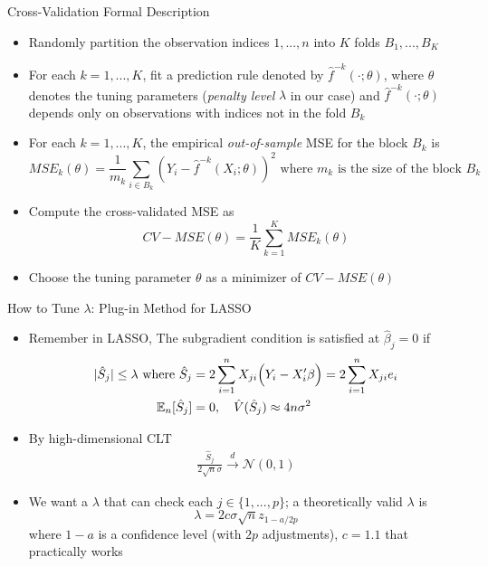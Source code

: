 \documentclass[aspectratio=1610,12pt,xcolor=dvipsnames]{beamer}
\begin{document}
\begin{frame}{Cross-Validation Formal Description}

\begin{itemize}
    \item Randomly partition the observation indices $1,...,n$ into $K$ folds $B_1,...,B_K$
    \item For each $k = 1,...,K$, fit a prediction rule denoted by $\hat f ^{-k} (\cdot;\theta)$, where $\theta$ denotes the tuning parameters (\textit{penalty level} $\lambda$ in our case) and $\hat f ^{-k} (\cdot;\theta)$ depends only on observations with indices not in the fold $B_k$
    \item For each $k=1,...,K$, the empirical \textit{out-of-sample} MSE for the block $B_k$ is 
    \[
    MSE_k(\theta) = \frac{1}{m_k} \sum_{i \in B_k} \left( Y_i - \hat f^{-k}(X_i;\theta) \right)^2 \text{ where $m_k$ is the size of the block $B_k$}
    \]
    \item Compute the cross-validated MSE as 
    \[
    CV-MSE(\theta) = \frac{1}{K}\sum_{k=1}^{K} MSE_k(\theta)
    \]
    \item Choose the tuning parameter $\theta$ as a minimizer of $CV-MSE(\theta)$
\end{itemize}   
\end{frame}

\begin{frame}{How to Tune $\lambda$: Plug-in Method for LASSO}

\begin{itemize}
    \item Remember in LASSO, The subgradient condition is satisfied at $\hat\beta_j = 0$ if
    \begin{align*}
        |\hat S_j| \leq \lambda  \text{ where } \hat S_j &= 2\sum_{i=1}^n X_{ji}\Bigl(Y_i - X_{i}'\beta\Bigr) = 2 \sum_{i=1}^n X_{ji}e_i \\
        \mathbb{E}_n[\hat S_j] &= 0, \quad \hat V(\hat S_j) \approx 4n\sigma^2
    \end{align*}
    \item By high-dimensional CLT
    \begin{align*}
        \frac{\hat S_j}{2 \sqrt{n}\sigma} \xrightarrow{d}\mathcal{N}(0,1)
    \end{align*}
    \item We want a $\lambda$ that can check each $j \in \{1,...,p\}$; a theoretically valid $\lambda$ is 
    \[
    \lambda = 2 c \sigma \sqrt{n}z_{1-a/2p}
    \]
    where $1-a$ is a confidence level (with $2p$ adjustments), $c=1.1$ that practically works
\end{itemize}
\end{frame}
\end{document}

